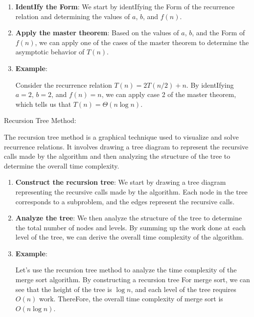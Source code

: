 \documentclass[12pt]{book} %
\begin{document}
\begin{enumerate}
    \item \textbf{IdentIfy the Form}: We start by identIfying the Form of the recurrence relation and determining the values of \(a\), \(b\), and \(f(n)\).
    
    \item \textbf{Apply the master theorem}: Based on the values of \(a\), \(b\), and the Form of \(f(n)\), we can apply one of the cases of the master theorem to determine the asymptotic behavior of \(T(n)\).
    
    \item \textbf{Example}:
    
    Consider the recurrence relation \(T(n) = 2T(n/2) + n\). By identIfying \(a = 2\), \(b = 2\), and \(f(n) = n\), we can apply case 2 of the master theorem, which tells us that \(T(n) = \Theta(n \log n)\).
\end{enumerate}
\FloatBarrier
Recursion Tree Method:
\FloatBarrier

The recursion tree method is a graphical technique used to visualize and solve recurrence relations. It involves drawing a tree diagram to represent the recursive calls made by the algorithm and then analyzing the structure of the tree to determine the overall time complexity.

\begin{enumerate}
    \item \textbf{Construct the recursion tree}: We start by drawing a tree diagram representing the recursive calls made by the algorithm. Each node in the tree corresponds to a subproblem, and the edges represent the recursive calls.
    
    \item \textbf{Analyze the tree}: We then analyze the structure of the tree to determine the total number of nodes and levels. By summing up the work done at each level of the tree, we can derive the overall time complexity of the algorithm.
    
    \item \textbf{Example}:
    
    Let's use the recursion tree method to analyze the time complexity of the merge sort algorithm. By constructing a recursion tree For merge sort, we can see that the height of the tree is \(\log n\), and each level of the tree requires \(O(n)\) work. ThereFore, the overall time complexity of merge sort is \(O(n \log n)\).
\end{enumerate}
\end{document}
